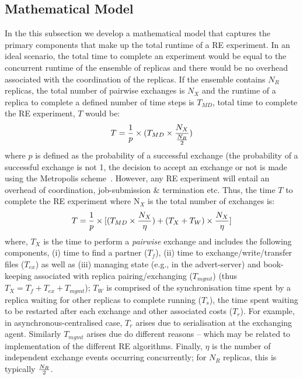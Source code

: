 \documentclass{rspublic}
\newcommand{\alnote}[1]{ {\textcolor{blue} { ***andre: #1 }}}
\newcommand{\alnote}[1]{}
\begin{document}
\subsection{Mathematical Model}
\label{sec:math-model}
In the this subsection we develop a mathematical model that captures
the primary components that make up the total runtime of a RE
experiment. In an ideal scenario, the total time to complete an
experiment would be equal to the concurrent runtime of the ensemble of
replicas and there would be no overhead associated with the
coordination of the replicas.  If the ensemble contains $N_R$
replicas, the total number of pairwise exchanges is $N_X$ and the
runtime of a replica to complete a defined number of time steps is
$T_{MD}$, total time to complete the RE experiment, $T$ would
be:
\begin{eqnarray}
T = {1\over p} \times (T_{MD} \times  {N_X \over {N_R \over 2}}) 
\label{eq:totaltime}
\end{eqnarray}
where $p$ is defined as the probability of a successful exchange (the
probability of a successful exchange is not 1, the decision to accept
an exchange or not is made using the Metropolis
scheme~\citep{metropolis:1087}. However, any RE experiment will
entail an overhead of coordination, job-submission \& termination
etc. Thus, the time $T$ to complete the RE experiment where N$_X$ is
the total number of exchanges is:
\begin{eqnarray}
  T = {1\over p} \times [(T_{MD} \times  {N_X \over {\eta}}) +
  {(T_{X} + T_{W})} \times {N_X \over \eta}]
\label{eq:totaltime}
\end{eqnarray}
where, $T_{X}$ is the time to perform a {\it pairwise} exchange and
includes the following components, (i) time to find a partner ($T_f$),
(ii) time to exchange/write/transfer files ($T_{ex}$) as well as (iii)
managing state (e.g., in the advert-server) and book-keeping
associated with replica pairing/exchanging ($T_{mgmt}$) (thus $T_{X} =
T_{f} + T_{ex}+T_{mgmt}$); $T_W$ is comprised of the synchronisation
time spent by a replica waiting for other replicas to complete running
($T_s$), the time spent waiting to be restarted after each exchange
and other associated costs ($T_r$). For example, in
asynchronous-centralised case, $T_r$ arises due to serialisation at
the exchanging agent.  Similarly $T_{mgmt}$ arises due do different
reasons -- which may be related to
implementation %
of the different RE algorithms. Finally, $\eta$ is the number of
independent exchange events occurring concurrently; for $N_R$
replicas, this is typically $N_R \over 2$.
\end{document}

